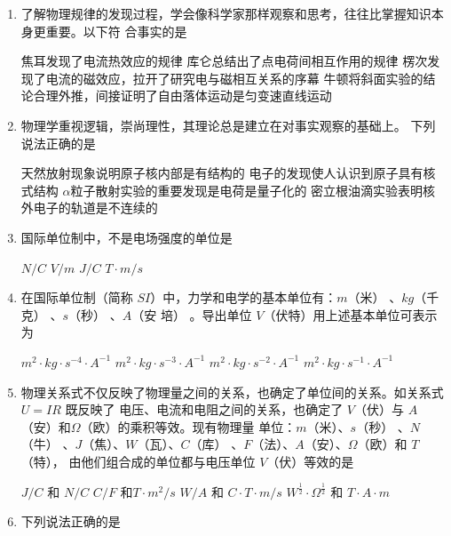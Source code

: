 \begin{enumerate}
\item
{}
了解物理规律的发现过程，学会像科学家那样观察和思考，往往比掌握知识本身更重要。以下符
合事实的是  

\fourchoices
{焦耳发现了电流热效应的规律}
{库仑总结出了点电荷间相互作用的规律}
{楞次发现了电流的磁效应，拉开了研究电与磁相互关系的序幕}
{牛顿将斜面实验的结论合理外推，间接证明了自由落体运动是匀变速直线运动}



\item
{}
物理学重视逻辑，崇尚理性，其理论总是建立在对事实观察的基础上。
下列说法正确的是  


\fourchoices
{天然放射现象说明原子核内部是有结构的}
{电子的发现使人认识到原子具有核式结构}
{$ \alpha $粒子散射实验的重要发现是电荷是量子化的}
{密立根油滴实验表明核外电子的轨道是不连续的}


\item 
{}
国际单位制中，不是电场强度的单位是  

\fourchoices
{$ N/C $}
{$ V/m $}
{$ J/C $}
{$ T \cdot m/s $}


\item 
{}
在国际单位制（简称 $ SI $）中，力学和电学的基本单位有：$ m $（米）
、$ kg $（千克）
、$ s $（秒）
、$ A $（安
培）
。导出单位 $ V $（伏特）用上述基本单位可表示为  


\fourchoices
{$m^{2} \cdot kg \cdot s^{-4} \cdot A^{-1}$}
{$m^{2} \cdot kg \cdot s^{-3} \cdot A^{-1}$}
{$m^{2} \cdot kg \cdot s^{-2} \cdot A^{-1}$}
{$m^{2} \cdot kg \cdot s^{-1} \cdot A^{-1}$}



\item 
{}
物理关系式不仅反映了物理量之间的关系，也确定了单位间的关系。如关系式 $ U=IR $ 既反映了
电压、电流和电阻之间的关系，也确定了 $ V $（伏）与 $ A $（安）和$ \Omega $（欧）的乘积等效。现有物理量
单位：$ m $（米）、$ s $（秒）
、$ N $（牛）
、$ J $（焦）、$ W $（瓦）、$ C $（库）
、$ F $（法）、$ A $（安）、$ \Omega $（欧）和 $ T $（特），
由他们组合成的单位都与电压单位 $ V $（伏）等效的是  

\fourchoices
{$ J/C $ 和 $ N/C $}
{$ C/F $ 和$ T \cdot m^{2} /s $}
{$ W/A $ 和 $ C \cdot T \cdot m/s $}
{$W^{\frac{1}{2}} \cdot \Omega^{\frac{1}{2}}$ 和 $T \cdot A \cdot m$}



\item 
{}
下列说法正确的是  



\end{enumerate}
